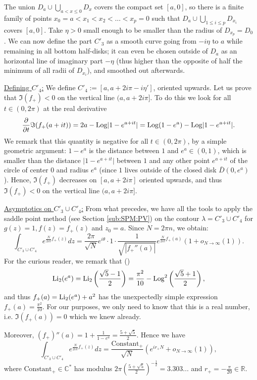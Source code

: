 \documentclass[11pt]{amsart}
\newcommand{\R}{\mathbb{R}}
\newcommand{\C}{\mathbb{C}}
\newcommand{\Log}{{\rm Log}}
\begin{document}
{The union $\textstyle D_a \cup \bigcup_{a<x \leqslant 0} D_x$ covers the compact set $[a,0]$, so there is a finite family of points $x_0=a<x_1<x_2<\ldots<x_p=0$ such that $\textstyle D_a \cup \bigcup_{1 \leqslant i \leqslant p} D_{x_i}$ covers $[a,0]$. Take $\eta>0$ small enough to be smaller than the radius of $D_{x_p}=D_0$.
 We can now define the part $C'_3$ as a smooth curve going from $-i\eta$ to $a$ while remaining in all bottom half-disks; it can even be chosen outside of $D_a$ as an horizontal line of imaginary part $-\eta$ (thus higher than the opposite of half the minimum of all radii of $D_{x_i}$), and smoothed out afterwards.

\smallskip

\underline{Defining $C'_4$:}
We define $C'_4:= [a,a+2i\pi-i\eta']$, oriented upwards. Let us prove that $\Im(f_+)<0$ on the vertical line $(a,a+2i\pi]$.
To do this we look for all $t \in (0,2\pi)$ at the real derivative
$$\dfrac{\partial}{\partial t} \Im (f_+(a+it))
=  2a - \Log \vert 1-e^{a+it} \vert
=  \Log (1-e^{a}) - \Log \vert 1-e^{a+it} \vert.
$$
We remark that this quantity is negative for all $t \in (0,2\pi)$, by a simple geometric argument: $1-e^a$ is the distance between $1$ and $e^a \in (0,1)$, which is smaller than the distance $\vert 1-e^{a+it} \vert$ between $1$ and any other point $e^{a+it}$ of the  circle of center $0$ and radius $e^a$ (since $1$ lives outside of the closed disk $\bar{D}(0,e^a)$). Hence, $\Im(f_+)$ decreases on $[a,a+2i\pi]$ oriented upwards, and thus $\Im(f_+)<0$ on the vertical line $(a,a+2i\pi]$.
\smallskip

\underline{Asymptotics on $C'_3 \cup C'_4$:}
From what precedes, we have  all the tools to apply the saddle point method (see Section \ref{sub:SPM:PV}) on the contour $\lambda=C'_3\cup C'_4$ for $g(z)=1, f(z)=f_+(z)$ and $z_0=a$. Since $N = 2\pi n$, we obtain:
$$ \int_{C'_3\cup C'_4} e^{\frac{N}{2 i \pi}f_+(z)}dz = \dfrac{{2\pi}}{\sqrt{N}} e^{i \theta}\cdot 1 \cdot \dfrac{1}{\sqrt{|f_+''(a)|}}
e^{\frac{N}{2i\pi} f_+(a)} \left ( 1+ o_{N \to \infty}(1) \right ).$$
For the curious reader, we remark that (\cite{Z}) $${\rm Li}_2(e^a)={\rm Li}_2\left (\frac{\sqrt{5}-1}{2}\right )= \frac{\pi^2}{10}-\Log^2\left (\frac{\sqrt{5}+1}{2}\right ),$$
and thus $f_+(a)={\rm Li}_2(e^a) +a^2$ has the unexpectedly simple expression
$\textstyle f_+(a)= \frac{\pi^2}{10} $. For our purposes, we only need to know that this is a real number, i.e. $\Im(f_+(a))=0$ which we knew already.

Moreover, $(f_+)''(a)=1+\frac{1}{1-e^a}= \frac{5+\sqrt{5}}{2}$. Hence we have
$$ \int_{C'_3\cup C'_4} e^{\frac{N}{2 i \pi}f_+(z)}dz = \dfrac{\text{Constant}_+}{\sqrt{N}}(e^{i r_+ N}+o_{N\to\infty}(1)),$$
where $\text{Constant}_+ \in \C^*$ has modulus $2\pi \left (\frac{5+\sqrt{5}}{2}\right )^{-\frac{1}{2}}=3.303...$ and $r_+=-\frac{\pi}{20} \in \R$.
\smallskip

}
\end{document}
